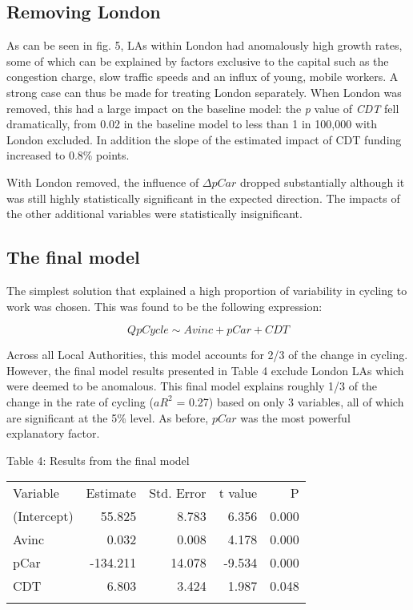 \subsection{Removing London}\label{removing-london}

As can be seen in fig. 5, LAs within London had anomalously high growth
rates, some of which can be explained by factors exclusive to the
capital such as the congestion charge, slow traffic speeds and an influx
of young, mobile workers. A strong case can thus be made for treating
London separately. When London was removed, this had a large impact on
the baseline model: the \emph{p} value of \emph{CDT} fell dramatically,
from 0.02 in the baseline model to less than 1 in 100,000 with London
excluded. In addition the slope of the estimated impact of CDT funding
increased to 0.8\% points.

With London removed, the influence of $\Delta pCar$ dropped
substantially although it was still highly statistically significant in
the expected direction. The impacts of the other additional variables
were statistically insignificant.

\subsection{The final model}\label{the-final-model}

The simplest solution that explained a high proportion of variability in
cycling to work was chosen. This was found to be the following
expression:

\[Q pCycle \sim Avinc + pCar +  CDT \]

Across all Local Authorities, this model accounts for 2/3 of the change
in cycling. However, the final model results presented in Table 4
exclude London LAs which were deemed to be anomalous. This final model
explains roughly 1/3 of the change in the rate of cycling ($aR^2$ =
0.27) based on only 3 variables, all of which are significant at the 5\%
level. As before, $pCar$ was the most powerful explanatory factor.

Table 4: Results from the final model

\begin{longtable}[c]{@{}lrrrr@{}}
\toprule\addlinespace
Variable & Estimate & Std. Error & t value & P
\\\addlinespace
\midrule\endhead
(Intercept) & 55.825 & 8.783 & 6.356 & 0.000
\\\addlinespace
Avinc & 0.032 & 0.008 & 4.178 & 0.000
\\\addlinespace
pCar & -134.211 & 14.078 & -9.534 & 0.000
\\\addlinespace
CDT & 6.803 & 3.424 & 1.987 & 0.048
\\\addlinespace
\bottomrule
\end{longtable}


